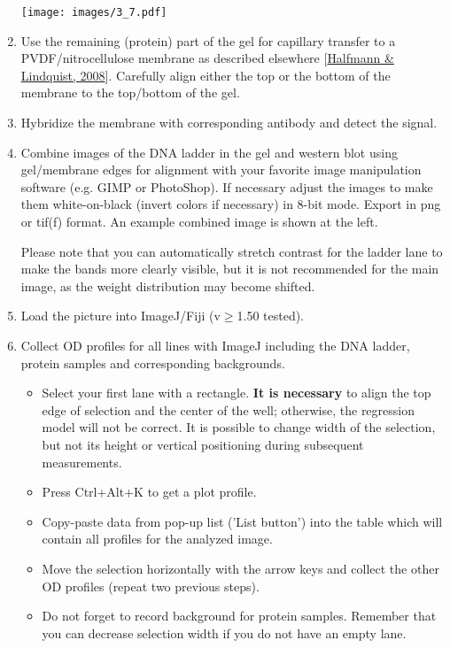 \documentclass[11pt]{article}
\begin{document}
\begin{enumerate}
\hskip 10mm
\texttt{[image: images/3\_7.pdf]}

\item Use the remaining (protein) part of the gel for capillary transfer to a PVDF/nitrocellulose membrane as described elsewhere [\hyperlink{dx.doi.org/10.3791/838}{Halfmann \& Lindquist, 2008}]. Carefully align either the top or the bottom of the membrane to the top/bottom of the gel.

\item Hybridize the membrane with corresponding antibody and detect the signal. 



	\item Combine images of the DNA ladder in the gel and western blot 
	using gel/membrane edges for alignment with your favorite image manipulation software (e.g. GIMP or PhotoShop). If necessary adjust the images to make them white-on-black (invert colors if necessary) in 8-bit mode. Export in png or tif(f) format. An example combined image is shown at the left.
	
	Please note that you can automatically stretch contrast for the ladder lane to make the bands more clearly visible, but it is not recommended for the main image, as the weight distribution may become shifted.
	


\item Load the picture into ImageJ/Fiji (v$\ge$1.50 tested).

\item Collect OD profiles for all lines with ImageJ including the DNA ladder, protein samples and corresponding backgrounds.

\begin{itemize}
	\item Select your first lane with a rectangle. \textbf{It is necessary} to align the top edge of selection and the center of the well; otherwise, the regression model will not be correct. It is possible to change width of the selection, but not its height or vertical positioning during subsequent measurements.
	\item Press Ctrl+Alt+K to get a plot profile.
	\item Copy-paste data from pop-up list ('List button') into the table which will contain all profiles for the analyzed image. 
	\item Move the selection horizontally with the arrow keys and collect the other OD profiles (repeat two previous steps).
	\item Do not forget to record background for protein samples. Remember that you can decrease selection width if you do not have an empty lane. 
\end{itemize}




\end{enumerate}
\end{document}

